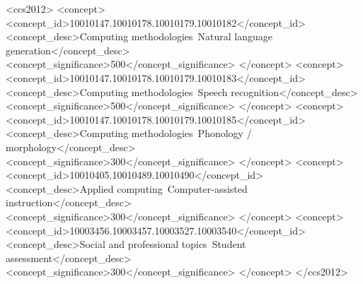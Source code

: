 \documentclass[sigconf,nonacm]{acmart}
\begin{document}
\begin{CCSXML}
<ccs2012>
   <concept>
       <concept_id>10010147.10010178.10010179.10010182</concept_id>
       <concept_desc>Computing methodologies~Natural language generation</concept_desc>
       <concept_significance>500</concept_significance>
       </concept>
   <concept>
       <concept_id>10010147.10010178.10010179.10010183</concept_id>
       <concept_desc>Computing methodologies~Speech recognition</concept_desc>
       <concept_significance>500</concept_significance>
       </concept>
   <concept>
       <concept_id>10010147.10010178.10010179.10010185</concept_id>
       <concept_desc>Computing methodologies~Phonology / morphology</concept_desc>
       <concept_significance>300</concept_significance>
       </concept>
   <concept>
       <concept_id>10010405.10010489.10010490</concept_id>
       <concept_desc>Applied computing~Computer-assisted instruction</concept_desc>
       <concept_significance>300</concept_significance>
       </concept>
   <concept>
       <concept_id>10003456.10003457.10003527.10003540</concept_id>
       <concept_desc>Social and professional topics~Student assessment</concept_desc>
       <concept_significance>300</concept_significance>
       </concept>
 </ccs2012>
\end{CCSXML}



\end{document}
